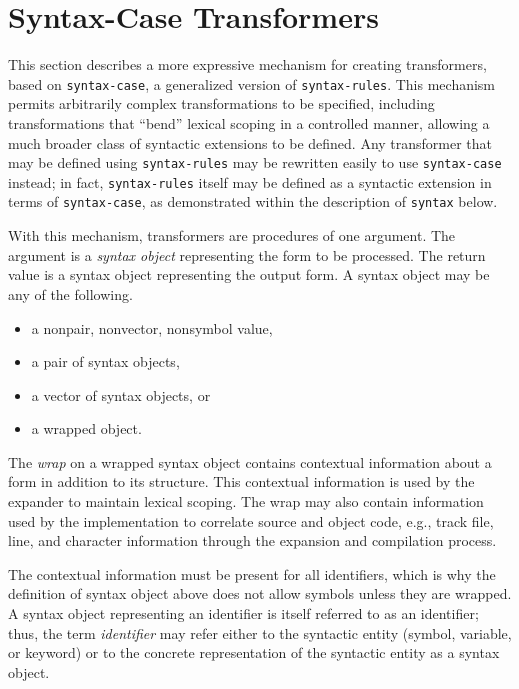 \section{\label{syntax_g136}\label{syntax_h3}Syntax-Case Transformers\label{syntax_SECTSYNTAXCASE}}



This section describes a more expressive mechanism for creating
transformers, based on \texttt{syntax-case}, a generalized version of
\texttt{syntax-rules}.
This mechanism permits arbitrarily complex transformations to be specified,
including transformations that ``bend'' lexical scoping in a
controlled manner, allowing a much broader class of syntactic
extensions to be defined.
Any transformer that may be defined using \texttt{syntax-rules} may be
rewritten easily to use \texttt{syntax-case} instead;
in fact, \texttt{syntax-rules}
itself may be defined as a syntactic extension in terms of
\texttt{syntax-case}, as demonstrated within the description of
\texttt{syntax} below.


\label{syntax_s29}With this mechanism, transformers are procedures of one argument.
The argument is a \textit{syntax object} representing the form to be
processed.
The return value is a syntax object representing the output form.
A syntax object may be any of the following.

\begin{itemize}
\item 
a nonpair, nonvector, nonsymbol value,
\item a pair of syntax objects,
\item a vector of syntax objects, or
\item a wrapped object.

\end{itemize}


The \textit{wrap} on a wrapped syntax object contains contextual information
about a form in addition to its structure.
This contextual information is used by the expander to maintain
lexical scoping.
The wrap may also contain information used by the implementation to
correlate source and object code, e.g., track file, line, and character 
information through the expansion and compilation process.


The contextual information must be present for all identifiers,
which is why the definition of syntax object above does not allow
symbols unless they are wrapped.
A syntax object representing an identifier is itself referred to as
an identifier; thus, the term \textit{identifier} may refer either to
the syntactic entity (symbol, variable, or keyword) or to the
concrete representation of the syntactic entity as a syntax object.


